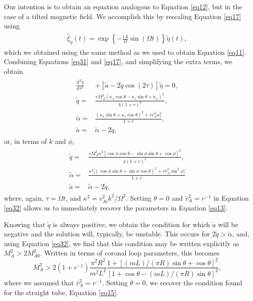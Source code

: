 \documentclass[12pt]{ociamthesis}
\begin{document}
Our intention is to obtain an equation analogous to Equation \eqref{eq12}, but in the case of a tilted magnetic field.
We accomplish this by rescaling Equation \eqref{eq17} using
\begin{align}
\begin{split}
\label{eq31}
\hat \xi_y(t) = \exp\left\{- \frac{i A}{\Omega} \sin(\Omega t)\right\} \tilde \eta(t),
\end{split}
\end{align}
which we obtained using the same method as we used to obtain Equation \eqref{eq11}.
Combining Equations \eqref{eq31} and \eqref{eq17}, and simplifying the extra terms, we obtain
\begin{align}
\begin{split}
\label{eq32}
\frac{\mathrm{d}^2 \tilde \eta}{\mathrm{d} \tau^2}
& + [\tilde a - 2 \tilde q \cos(2 \tau)] \tilde \eta = 0,
\\[0.3cm]
\tilde q 
= & \frac{r M_A^2 \left( \kappa_x \cos\theta - \kappa_z \sin\theta
+ \kappa_x \right)^2}{4 (1 + r)^2},
\\[0.3cm]
\tilde \alpha 
= & \frac{\left( \kappa_x \sin\theta
+ \kappa_z \cos\theta \right)^2
+ r \bar v_A^2 \kappa_z^2}
{1 + r},
\\[0.3cm]
\tilde a = & \tilde \alpha - 2 \tilde q,
\end{split}
\end{align}
or, in terms of $k$ and $\phi$,
\begin{align}
\begin{split}
\label{eq33}
\tilde q = &
\frac{r M_A^2 \kappa^2 \left[ \cos\phi \cos\theta
- \sin\phi \sin\theta
+ \cos\phi \right]^2}
{4 (1 + r)^2},
\\[0.3cm]
\tilde \alpha = &
\frac{\kappa^2 \big[ \left( \cos\phi \sin\theta
+ \sin\phi \cos\theta \right)^2
+ r \bar v_A^2 \sin^2\phi \big]}{1 + r}
\\[0.3cm]
\tilde a = & \tilde \alpha
- 2 \tilde q,
\end{split}
\end{align}
where, again, $\tau = \Omega t$, and $\kappa^2 = v_{A i}^2 k^2 / \Omega^2$.
Setting $\theta = 0$ and $\bar v_A^2 = r^{-1}$ in Equation \eqref{eq32} allows us to immediately recover the parameters in Equation \eqref{eq13}.

Knowing that $\tilde q$ is always positive, we obtain the condition for which $\tilde a$ will be negative and the solution will, typically, be unstable.
This occurs for $2 \tilde q > \tilde \alpha$, and, using Equation \eqref{eq32}, we find that this condition may be written explicitly as $M_A^2 > 2 M_{A0}^2$.
Written in terms of coronal loop parameters, this becomes
\begin{equation}
\label{eq40}
M_A^2 > 2 (1 + r^{-1}) 
\frac{\pi^2 R^2}{m^2 L^2}
\frac{1 + \left[(m L)/(\pi R) \sin\theta + \cos\theta \right]^2}
{[1 + \cos\theta - (m L)/(\pi R) \sin\theta]^2},
\end{equation}
where we assumed that $\bar v_{A}^2 = r^{-1}$.
Setting $\theta = 0$, we recover the condition found for the straight tube, Equation \eqref{eq15}.
\end{document}
